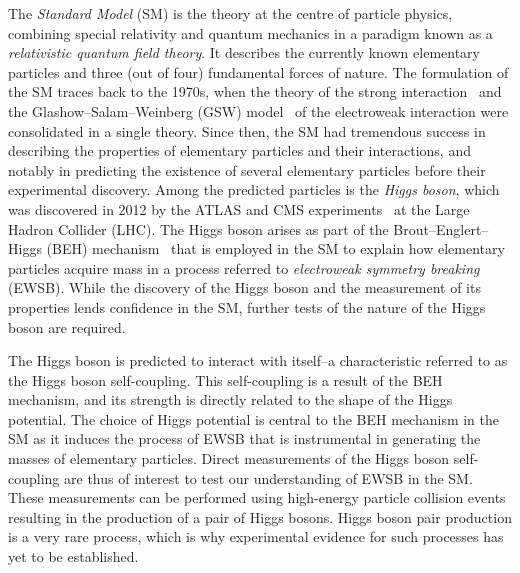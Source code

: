 The \emph{Standard Model} (SM) is the theory at the centre of particle physics,
combining special relativity and quantum mechanics in a paradigm known as a
\emph{relativistic quantum field theory}. It describes the currently known
elementary particles and three (out of four) fundamental forces of nature. The
formulation of the SM traces back to the 1970s, when the theory of the strong
interaction~\cite{Fritzsch:1973pi,Gross:1973id,Politzer:1973fx}
and the Glashow--Salam--Weinberg (GSW)
model~\cite{Glashow:1961tr,Salam:1964ry,Weinberg:1967tq} of the electroweak
interaction were consolidated in a single theory. Since then, the SM had
tremendous success in describing the properties of elementary particles and
their interactions, and notably in predicting the existence of several
elementary particles before their experimental discovery. Among the predicted
particles is the \emph{Higgs boson}, which was discovered in 2012 by the ATLAS
and CMS experiments~\cite{HIGG-2012-27,CMS-HIG-12-028} at the Large Hadron
Collider (LHC). The Higgs boson arises as part of the Brout--Englert--Higgs
(BEH) mechanism~\cite{Englert:1964et,Higgs:1964pj} that is employed in the SM to explain how elementary
particles acquire mass in a process referred to \emph{electroweak symmetry
  breaking} (EWSB).
While the discovery of the Higgs boson and the measurement of its properties
lends confidence in the SM, further tests of the nature of the Higgs boson are
required.


%


The Higgs boson is predicted to interact with itself--a characteristic referred
to as the Higgs boson self-coupling. This self-coupling is a result of the BEH
mechanism, and its strength is directly related to the shape of the Higgs
potential. The choice of Higgs potential is central to the BEH mechanism in the
SM as it induces the process of EWSB that is instrumental in generating the
masses of elementary particles. Direct measurements of the Higgs boson
self-coupling are thus of interest to test our understanding of EWSB in the SM.
These measurements can be performed using high-energy particle collision events
resulting in the production of a pair of Higgs bosons. Higgs boson pair
production is a very rare process, which is why experimental evidence for such
processes has yet to be established.


